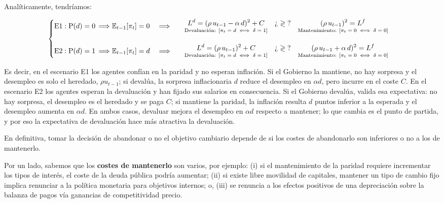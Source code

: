 \documentclass[10pt,a4paper]{article}
\begin{document}
Analíticamente, tendríamos:

$$\left\{\begin{aligned}
  &\text{E}1:\mathrm P(d)=0\,\Longrightarrow \mathbb E_{t-1}[\pi_t]=0\quad\Longrightarrow\quad&&
  \begin{aligned}
    &\underset{\text{\scriptsize Devaluación: $[\pi_t=d\iff\delta=1]$}}{L^d=(\rho\,u_{t-1}-\alpha\,d)^2+C}&&\text{¿}\gtrless\text{?}&& \underset{\text{\scriptsize Mantenimiento: $[\pi_t=0\iff \delta=0]$}}{(\rho\,u_{t-1})^2=L^f}
  \end{aligned}\\[1em]
  &\text{E}2:\mathrm P(d)=1\,\Longrightarrow \mathbb E_{t-1}[\pi_t]=d\quad\Longrightarrow\quad&&
  \begin{aligned}
    &\underset{\text{\scriptsize Devaluación: $[\pi_t=d\iff\delta=1]$}}{L^d=(\rho\,u_{t-1})^2+C}&&\text{¿}\gtrless\text{?}&&\underset{\text{\scriptsize Mantenimiento: $[\pi_t=0\iff \delta=0]$}}{(\rho\,u_{t-1}+\alpha\,d)^2=L^f}
    \end{aligned}
\end{aligned}\right.$$

Es decir, en el escenario E1 los agentes confían en la paridad y no esperan inflación. Si el Gobierno la mantiene, no hay sorpresa y el desempleo es solo el heredado, $\rho u_{t-1}$; si devalúa, la sorpresa inflacionaria $d$ reduce el desempleo en $\alpha d$, pero incurre en el coste $C$. En el escenario E2 los agentes esperan la devaluación y han fijado sus salarios en consecuencia. Si el Gobierno devalúa, valida esa expectativa: no hay sorpresa, el desempleo es el heredado y se paga $C$; si mantiene la paridad, la inflación resulta $d$ puntos inferior a la esperada y el desempleo aumenta en $\alpha d$. En ambos casos, devaluar mejora el desempleo en $\alpha d$ respecto a mantener; lo que cambia es el punto de partida, y por eso la expectativa de devaluación hace más atractiva la devaluación.

En definitiva, tomar la decisión de abandonar o no el objetivo cambiario depende de si los costes de abandonarlo son inferiores o no a los de mantenerlo.

Por un lado, sabemos que los \textbf{costes de mantenerlo} son varios, por ejemplo: (i) si el mantenimiento de la paridad requiere incrementar los tipos de interés, el coste de la deuda pública podría aumentar; (ii) si existe libre movilidad de capitales, mantener un tipo de cambio fijo implica renunciar a la política monetaria para objetivos internos; o, (iii) se renuncia a los efectos positivos de una depreciación sobre la balanza de pagos vía ganancias de competitividad precio.
\end{document}
